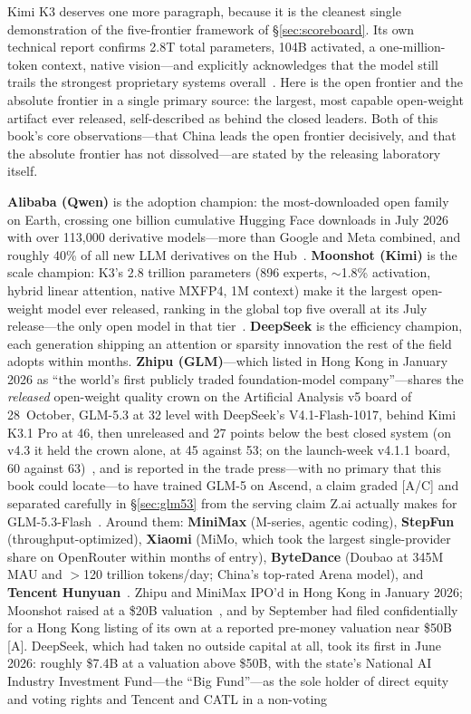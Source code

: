 Kimi K3 deserves one more paragraph, because it is the cleanest single demonstration of the five-frontier framework of \S\ref{sec:scoreboard}. Its own technical report confirms 2.8T total parameters, 104B activated, a one-million-token context, native vision---and explicitly acknowledges that the model still trails the strongest proprietary systems overall~\cite{kimiK3-report}. Here is the open frontier and the absolute frontier in a single primary source: the largest, most capable open-weight artifact ever released, self-described as behind the closed leaders. Both of this book's core observations---that China leads the open frontier decisively, and that the absolute frontier has not dissolved---are stated by the releasing laboratory itself.

\textbf{Alibaba (Qwen)} is the adoption champion: the most-downloaded open family on Earth, crossing one billion cumulative Hugging Face downloads in July 2026 with over 113,000 derivative models---more than Google and Meta combined, and roughly 40\% of all new LLM derivatives on the Hub~\cite{hf-spring-2026,qwen-billion}. \textbf{Moonshot (Kimi)} is the scale champion: K3's 2.8 trillion parameters (896 experts, $\sim$1.8\% activation, hybrid linear attention, native MXFP4, 1M context) make it the largest open-weight model ever released, ranking in the global top five overall at its July release---the only open model in that tier~\cite{kimi-k3}. \textbf{DeepSeek} is the efficiency champion, each generation shipping an attention or sparsity innovation the rest of the field adopts within months. \textbf{Zhipu (GLM)}---which listed in Hong Kong in January 2026 as ``the world's first publicly traded foundation-model company''---shares the \emph{released} open-weight quality crown on the Artificial Analysis v5 board of 28~October, GLM-5.3 at 32 level with DeepSeek's V4.1-Flash-1017, behind Kimi K3.1 Pro at 46, then unreleased and 27 points below the best closed system (on v4.3 it held the crown alone, at 45 against 53; on the launch-week v4.1.1 board, 60 against 63)~\cite{mdl-aa-v5}, and is reported in the trade press---with no primary that this book could locate---to have trained GLM-5 on Ascend, a claim graded [A/C] and separated carefully in \S\ref{sec:glm53} from the serving claim Z.ai actually makes for GLM-5.3-Flash~\cite{glm5,glm53-aa,aa-v43,glm5-ascend-unsourced,ipos}. Around them: \textbf{MiniMax} (M-series, agentic coding), \textbf{StepFun} (throughput-optimized), \textbf{Xiaomi} (MiMo, which took the largest single-provider share on OpenRouter within months of entry), \textbf{ByteDance} (Doubao at 345M MAU and $>$120 trillion tokens/day; China's top-rated Arena model), and \textbf{Tencent Hunyuan}~\cite{digitalapplied,datagravity}. Zhipu and MiniMax IPO'd in Hong Kong in January 2026; Moonshot raised at a \$20B valuation~\cite{ipos}, and by September had filed confidentially for a Hong Kong listing of its own at a reported pre-money valuation near \$50B~\cite{moonshot-ipo} [A]. DeepSeek, which had taken no outside capital at all, took its first in June 2026: roughly \$7.4B at a valuation above \$50B, with the state's National AI Industry Investment Fund---the ``Big Fund''---as the sole holder of direct equity and voting rights and Tencent and CATL in a non-voting 